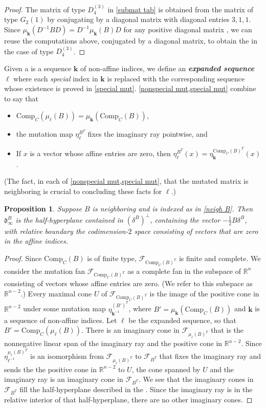 \documentclass{amsart}
\newtheorem{proposition}{Proposition}[section]
\theoremstyle{definition}
\theoremstyle{remark}
\numberwithin{equation}{section}
\newcommand{\newword}[1]{\textbf{\emph{#1}}}
\newcommand{\reals}{\mathbb R}
\newcommand{\F}{{\mathcal F}}
\newcommand{\0}{{\mathbf{0}}}
\newcommand{\Comp}{\mathrm{Comp}_C}
\newcommand{\kk}{\mathbf{k}}
\renewcommand{\ll}{{\boldsymbol\ell}}
\renewcommand{\d}{{\mathfrak d}}
\begin{document}
\begin{proof}
The matrix of type $D_4^{(3)}$ in \cref{submat tab} is obtained from the matrix of type $G_2{(1)}$ by conjugating by a diagonal matrix with diagonal entries $3,1,1$.
Since $\mu_\kk(D^{-1}BD)=D^{-1}\mu_\kk(B)D$ for any positive diagonal matrix \cite[Proposition~4.5]{ca1}, we can reuse the computations above, conjugated by a diagonal matrix, to obtain the  in the case of type $D_4^{(3)}$.
\end{proof}

Given a  is a sequence $\kk$ of non-affine indices, we define an \newword{expanded sequence}~$\ll$ where each \emph{special} index in $\kk$ is replaced with the corresponding sequence whose existence is proved in \cref{special mut}.
\cref{nonspecial mut,special mut} combine to say that 
\begin{itemize}
\item
$\Comp(\mu_\ll(B))=\mu_\kk(\Comp(B))$,
\item
the mutation map $\eta^{B^T}_\ll$ fixes the imaginary ray pointwise, and 
\item
If $x$ is a vector whose affine entries are zero, then $\eta^{B^T}_\ll(x)=\eta^{\Comp(B)^T}_\kk(x)$.
\end{itemize}
(The fact, in each of \cref{nonspecial mut,special mut}, that the mutated matrix is neighboring is crucial to concluding these facts for $\ll$.)

\begin{proposition}\label{neigh im wall}
Suppose $B$ is neighboring and is indexed as in \cref{neigh B}.
Then $\d^B_\infty$ is the half-hyperplane contained in $(\delta^B)^\perp$, containing the vector $-\frac12B\delta^B$, with relative boundary the codimension-$2$ space consisting of vectors that are zero in the affine indices.
\end{proposition}
\begin{proof}
Since $\Comp(B)$ is of finite type, $\F_{\Comp(B)^T}$ is finite and complete.
We consider the mutation fan $\F_{\Comp(B)^T}$ as a complete fan in the subspace of $\reals^n$ consisting of vectors whose affine entries are zero. 
(We refer to this subspace as $\reals^{n-2}$.)
Every maximal cone $U$ of $\F_{\Comp(B)^T}$ is the image of the positive cone in $\reals^{n-2}$ under some mutation map $\eta^{(B')^T}_{\kk^{-1}}$, where $B'=\mu_\kk(\Comp(B))$ and $\kk$ is a sequence of non-affine indices.  
Let $\ll$ be the expanded sequence, so that $B'=\Comp(\mu_\ll(B))$.
There is an imaginary cone in $\F_{\mu_\ll(B)^T}$ that is the nonnegative linear span of the imaginary ray and the positive cone in $\reals^{n-2}$.
Since $\eta^{\mu_\ll(B)^T}_{\ell^{-1}}$ is an isomorphism from $\F_{\mu_\ll(B)^T}$ to $\F_{B^T}$ that fixes the imaginary ray and sends the the positive cone in $\reals^{n-2}$ to $U$, the cone spanned by $U$ and the imaginary ray is an imaginary cone in $\F_{B^T}$.
We see that the imaginary cones in $\F_{B^T}$ fill the half-hyperplane described in the .
Since the imaginary ray is in the relative interior of that half-hyperplane, there are no other imaginary cones.
\end{proof}
\end{document}
